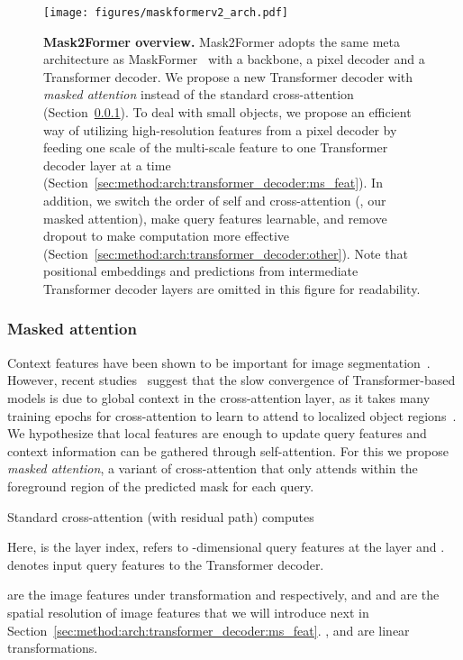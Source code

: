 \documentclass[10pt,twocolumn,letterpaper]{article}
\newcommand{\modelname}{Mask2Former\xspace}
\newcommand{\secref}[1]{Section~\ref{#1}}
\begin{document}
\begin{figure}[t]
    \centering
    \texttt{[image: figures/maskformerv2\_arch.pdf]}
    \caption{\textbf{\modelname overview.} \modelname adopts the same meta architecture as MaskFormer~\cite{cheng2021maskformer} with a backbone, a pixel decoder and a Transformer decoder. We propose a new Transformer decoder with \emph{masked attention} instead of the standard cross-attention (\secref{sec:method:arch:transformer_decoder:mask_attn}). To deal with small objects, we propose an efficient way of utilizing high-resolution features from a pixel decoder by feeding one scale of the multi-scale feature to one Transformer decoder layer at a time (\secref{sec:method:arch:transformer_decoder:ms_feat}). In addition, we switch the order of self and cross-attention (\ie, our masked attention), make query features learnable, and remove dropout to make computation more effective (\secref{sec:method:arch:transformer_decoder:other}). Note that positional embeddings and predictions from intermediate Transformer decoder layers are omitted in this figure for readability.}
    \label{fig:arch}
\end{figure}

\subsubsection{Masked attention}
\label{sec:method:arch:transformer_decoder:mask_attn}

Context features have been shown to be important for image segmentation~\cite{deeplabV2,deeplabV3,zhao2017pspnet}. However, recent studies~\cite{sun2021rethinking,gao2021smca} suggest that the slow convergence of Transformer-based models is due to global context in the cross-attention layer, as it takes many training epochs for cross-attention to learn to attend to localized object regions~\cite{sun2021rethinking}. We hypothesize that local features are enough to update query features and context information can be gathered through self-attention. For this we propose \emph{masked attention}, a variant of cross-attention that only attends within the foreground region of the predicted mask for each query.

Standard cross-attention (with residual path) computes

Here,  is the layer index,  refers to  -dimensional query features at the  layer and .  denotes input query features to the Transformer decoder.

are the image features under transformation  and  respectively, and  and  are the spatial resolution of image features that we will introduce next in \secref{sec:method:arch:transformer_decoder:ms_feat}. ,  and  are linear transformations.
\end{document}
